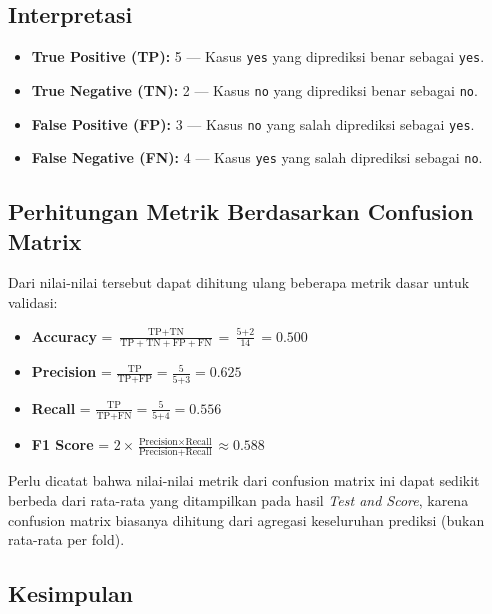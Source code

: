 \subsection*{Interpretasi}

\begin{itemize}
	\item \textbf{True Positive (TP):} 5 — Kasus \texttt{yes} yang diprediksi benar sebagai \texttt{yes}.
	\item \textbf{True Negative (TN):} 2 — Kasus \texttt{no} yang diprediksi benar sebagai \texttt{no}.
	\item \textbf{False Positive (FP):} 3 — Kasus \texttt{no} yang salah diprediksi sebagai \texttt{yes}.
	\item \textbf{False Negative (FN):} 4 — Kasus \texttt{yes} yang salah diprediksi sebagai \texttt{no}.
\end{itemize}

\subsection*{Perhitungan Metrik Berdasarkan Confusion Matrix}

Dari nilai-nilai tersebut dapat dihitung ulang beberapa metrik dasar untuk validasi:

\begin{itemize}
	\item \textbf{Accuracy} = \( \frac{\text{TP} + \text{TN}}{\text{TP} + \text{TN} + \text{FP} + \text{FN}} = \frac{\text{5} + \text{2}}{\text{14}} = \text{0.500} \)
	\item \textbf{Precision} = \( \frac{\text{TP}}{\text{TP} + \text{FP}} = \frac{\text{5}}{\text{5} + \text{3}} = \text{0.625} \)
	\item \textbf{Recall} = \( \frac{\text{TP}}{\text{TP} + \text{FN}} = \frac{\text{5}}{\text{5} + \text{4}} = \text{0.556} \)
	\item \textbf{F1 Score} = \( 2 \times \frac{\text{Precision} \times \text{Recall}}{\text{Precision} + \text{Recall}} \approx \text{0.588} \)
\end{itemize}


Perlu dicatat bahwa nilai-nilai metrik dari confusion matrix ini dapat sedikit berbeda dari rata-rata yang ditampilkan pada hasil \textit{Test and Score}, karena confusion matrix biasanya dihitung dari agregasi keseluruhan prediksi (bukan rata-rata per fold).

\subsection*{Kesimpulan}

